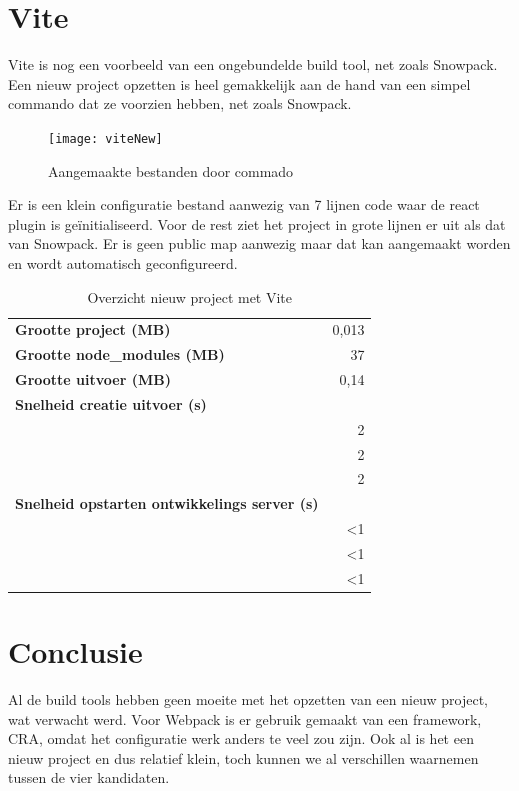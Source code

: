 \section{Vite}
Vite is nog een voorbeeld van een ongebundelde build tool, net zoals Snowpack. Een nieuw project opzetten is heel gemakkelijk aan de hand van een simpel commando dat ze voorzien hebben, net zoals Snowpack.



\begin{figure}[h]
   \texttt{[image: viteNew]}
       \centering
       \caption[Aangemaakte bestanden door Vite commando]{Aangemaakte bestanden door commado}
   \end{figure}

Er is een klein configuratie bestand aanwezig van 7 lijnen code waar de react plugin is geïnitialiseerd. Voor de rest ziet het project in grote lijnen er uit als dat van Snowpack. Er is geen public map aanwezig maar dat kan aangemaakt worden en wordt automatisch geconfigureerd.

\begin{table}[h]
   \centering
   \begin{tabular}{lr}
   \textbf{Grootte project (MB)} & 0,013 \\
   \textbf{Grootte node\_modules (MB)} & 37 \\
   \textbf{Grootte uitvoer (MB)} & 0,14 \\
   \textbf{Snelheid creatie uitvoer (s)} & \\
   \textbf{} & 2 \\
   \textbf{} & 2 \\
   \textbf{} & 2 \\
   \textbf{Snelheid opstarten ontwikkelings server (s)} & \\
   \textbf{} & <1 \\
   \textbf{} & <1 \\
   \textbf{} & <1
   \end{tabular}
   \caption{Overzicht nieuw project met Vite}
   \end{table}


\section{Conclusie}
Al de build tools hebben geen moeite met het opzetten van een nieuw project, wat verwacht werd. Voor Webpack is er gebruik gemaakt van een framework, CRA, omdat het configuratie werk anders te veel zou zijn. Ook al is het een nieuw project en dus relatief klein, toch kunnen we al verschillen waarnemen tussen de vier kandidaten.

